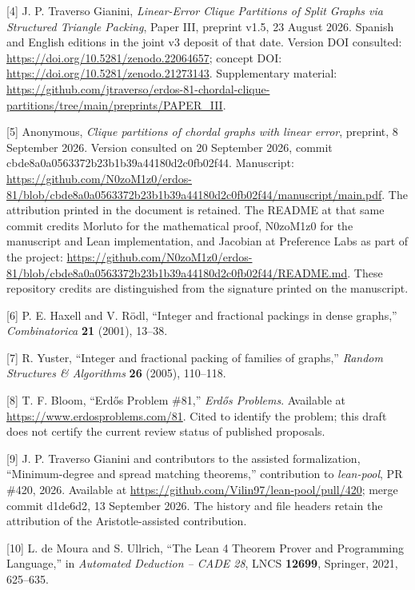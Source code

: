 \documentclass[english,11pt,a4paper]{article}
\begin{document}
{[}4{]} J. P. Traverso Gianini, \emph{Linear-Error Clique Partitions of Split Graphs via Structured Triangle Packing}, Paper III, preprint v1.5, 23 August 2026. Spanish and English editions in the joint v3 deposit of that date. Version DOI consulted: \url{https://doi.org/10.5281/zenodo.22064657}; concept DOI: \url{https://doi.org/10.5281/zenodo.21273143}. Supplementary material: \url{https://github.com/jtraverso/erdos-81-chordal-clique-partitions/tree/main/preprints/PAPER_III}.

{[}5{]} Anonymous, \emph{Clique partitions of chordal graphs with linear error}, preprint, 8 September 2026. Version consulted on 20 September 2026, commit {\ttfamily\small cbde8a0a0563\discretionary{\hbox{\ensuremath{\hookrightarrow}}}{}{}372b23b1b39a\discretionary{\hbox{\ensuremath{\hookrightarrow}}}{}{}44180d2c0fb0\discretionary{\hbox{\ensuremath{\hookrightarrow}}}{}{}2f44}. Manuscript: \url{https://github.com/N0zoM1z0/erdos-81/blob/cbde8a0a0563372b23b1b39a44180d2c0fb02f44/manuscript/main.pdf}. The attribution printed in the document is retained. The README at that same commit credits Morluto for the mathematical proof, N0zoM1z0 for the manuscript and Lean implementation, and Jacobian at Preference Labs as part of the project: \url{https://github.com/N0zoM1z0/erdos-81/blob/cbde8a0a0563372b23b1b39a44180d2c0fb02f44/README.md}. These repository credits are distinguished from the signature printed on the manuscript.

{[}6{]} P. E. Haxell and V. Rödl, ``Integer and fractional packings in dense graphs,'' \emph{Combinatorica} \textbf{21} (2001), 13--38.

{[}7{]} R. Yuster, ``Integer and fractional packing of families of graphs,'' \emph{Random Structures \& Algorithms} \textbf{26} (2005), 110--118.

{[}8{]} T. F. Bloom, ``Erdős Problem \#81,'' \emph{Erdős Problems}. Available at \url{https://www.erdosproblems.com/81}. Cited to identify the problem; this draft does not certify the current review status of published proposals.

{[}9{]} J. P. Traverso Gianini and contributors to the assisted formalization, ``Minimum-degree and spread matching theorems,'' contribution to \emph{lean-pool}, PR \#420, 2026. Available at \url{https://github.com/Vilin97/lean-pool/pull/420}; merge commit {\ttfamily\small d1de6d2}, 13 September 2026. The history and file headers retain the attribution of the Aristotle-assisted contribution.

\clearpage
{[}10{]} L. de Moura and S. Ullrich, ``The Lean 4 Theorem Prover and Programming Language,'' in \emph{Automated Deduction -- CADE 28}, LNCS \textbf{12699}, Springer, 2021, 625--635.
\end{document}
